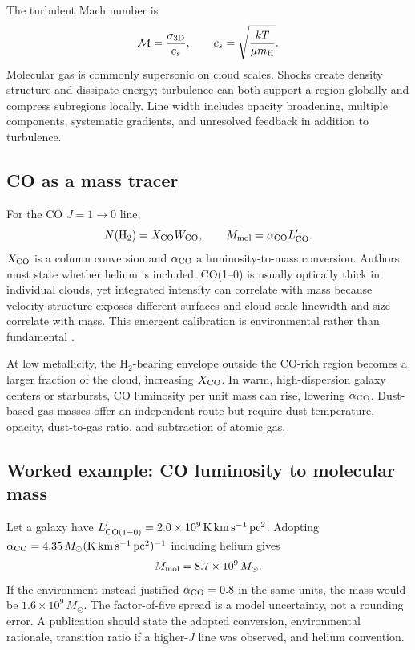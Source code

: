 The turbulent Mach number is
\begin{equation}
 \mathcal{M}=\frac{\sigma_{\rm 3D}}{c_s},
 \qquad c_s=\sqrt{\frac{kT}{\mu m_{\rm H}}}.
 \label{eq:mach-number}
\end{equation}
Molecular gas is commonly supersonic on cloud scales.  Shocks create density
structure and dissipate energy; turbulence can both support a region globally and
compress subregions locally.  Line width includes opacity broadening, multiple
components, systematic gradients, and unresolved feedback in addition to turbulence.

\subsection{CO as a mass tracer}

For the CO $J=1\rightarrow0$ line,
\begin{equation}
 N({\rm H_2})=X_{\rm CO}W_{\rm CO},
 \qquad
 M_{\rm mol}=\alpha_{\rm CO}L'_{\rm CO}.
 \label{eq:xco-alpha-co}
\end{equation}
$X_{\rm CO}$ is a column conversion and $\alpha_{\rm CO}$ a luminosity-to-mass
conversion.  Authors must state whether helium is included.  CO(1--0) is usually
optically thick in individual clouds, yet integrated intensity can correlate with
mass because velocity structure exposes different surfaces and cloud-scale linewidth
and size correlate with mass.  This emergent calibration is environmental rather than
fundamental \citep{BolattoWolfireLeroy2013}.

At low metallicity, the H$_2$-bearing envelope outside the CO-rich region becomes a
larger fraction of the cloud, increasing $X_{\rm CO}$.  In warm, high-dispersion
galaxy centers or starbursts, CO luminosity per unit mass can rise, lowering
$\alpha_{\rm CO}$.  Dust-based gas masses offer an independent route but require
dust temperature, opacity, dust-to-gas ratio, and subtraction of atomic gas.

\subsection{Worked example: CO luminosity to molecular mass}

Let a galaxy have
$L'_{\rm CO(1-0)}=2.0\times10^9\,
\mathrm{K\,km\,s^{-1}\,pc^2}$.  Adopting
$\alpha_{\rm CO}=4.35\,
M_\odot(\mathrm{K\,km\,s^{-1}\,pc^2})^{-1}$ including helium gives
\begin{equation}
 M_{\rm mol}=8.7\times10^9\,M_\odot.
\end{equation}
If the environment instead justified
$\alpha_{\rm CO}=0.8$ in the same units, the mass would be
$1.6\times10^9\,M_\odot$.  The factor-of-five spread is a model uncertainty, not a
rounding error.  A publication should state the adopted conversion, environmental
rationale, transition ratio if a higher-$J$ line was observed, and helium convention.

